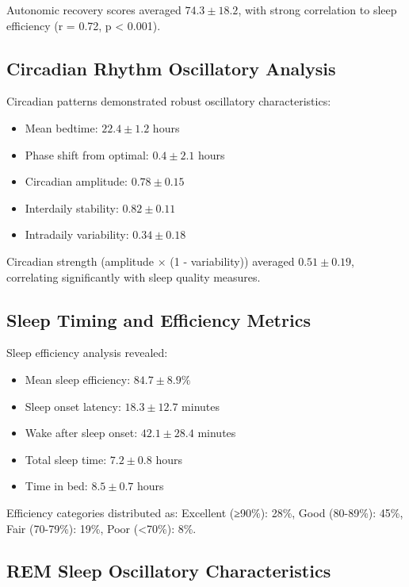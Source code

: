 \documentclass[twocolumn]{article}
\begin{document}
Autonomic recovery scores averaged $74.3 \pm 18.2$, with strong correlation to sleep efficiency (r = 0.72, p < 0.001).

\subsection{Circadian Rhythm Oscillatory Analysis}

Circadian patterns demonstrated robust oscillatory characteristics:

\begin{itemize}
\item Mean bedtime: $22.4 \pm 1.2$ hours
\item Phase shift from optimal: $0.4 \pm 2.1$ hours
\item Circadian amplitude: $0.78 \pm 0.15$
\item Interdaily stability: $0.82 \pm 0.11$
\item Intradaily variability: $0.34 \pm 0.18$
\end{itemize}

Circadian strength (amplitude × (1 - variability)) averaged $0.51 \pm 0.19$, correlating significantly with sleep quality measures.

\subsection{Sleep Timing and Efficiency Metrics}

Sleep efficiency analysis revealed:

\begin{itemize}
\item Mean sleep efficiency: $84.7 \pm 8.9\%$
\item Sleep onset latency: $18.3 \pm 12.7$ minutes
\item Wake after sleep onset: $42.1 \pm 28.4$ minutes
\item Total sleep time: $7.2 \pm 0.8$ hours
\item Time in bed: $8.5 \pm 0.7$ hours
\end{itemize}

Efficiency categories distributed as: Excellent (≥90\%): 28\%, Good (80-89\%): 45\%, Fair (70-79\%): 19\%, Poor (<70\%): 8\%.

\subsection{REM Sleep Oscillatory Characteristics}
\end{document}
